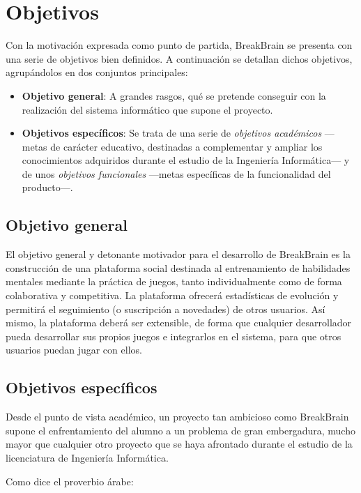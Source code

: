 \section{Objetivos}

Con la motivación expresada como punto de partida, BreakBrain se presenta con una serie de objetivos bien definidos. A continuación se detallan dichos objetivos, agrupándolos en dos conjuntos principales:

\begin{itemize}
\item {\bf Objetivo general}: A grandes rasgos, qué se pretende conseguir con la realización del sistema informático que supone el proyecto.
\item {\bf Objetivos específicos}: Se trata de una serie de {\it objetivos académicos} ---metas de carácter educativo, destinadas a complementar y ampliar los conocimientos adquiridos durante el estudio de la Ingeniería Informática--- y de unos {\it objetivos funcionales} ---metas específicas de la funcionalidad del producto---.
\end{itemize}

\subsection{Objetivo general}

El objetivo general y detonante motivador para el desarrollo de BreakBrain es la construcción de una plataforma social destinada al entrenamiento de habilidades mentales mediante la práctica de juegos, tanto individualmente como de forma colaborativa y competitiva. La plataforma ofrecerá estadísticas de evolución y permitirá el seguimiento (o suscripción a novedades) de otros usuarios. Así mismo, la plataforma deberá ser extensible, de forma que cualquier desarrollador pueda desarrollar sus propios juegos e integrarlos en el sistema, para que otros usuarios puedan jugar con ellos.

\subsection{Objetivos específicos}

Desde el punto de vista académico, un proyecto tan ambicioso como BreakBrain supone el enfrentamiento del alumno a un problema de gran embergadura, mucho mayor que cualquier otro proyecto que se haya afrontado durante el estudio de la licenciatura de Ingeniería Informática.

Como dice el proverbio árabe:


